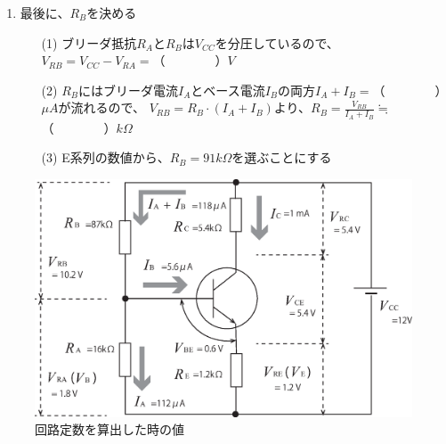 \documentclass[uplatex,a4paper,11pt,oneside,openany]{jsbook}
\begin{document}
\begin{enumerate}
\begin{itembox}[l]{設計条件}
		(6) このトランジスタのベース−エミッタ間の電圧は$V_{BE}\fallingdotseq 0.6V$とする。\\
		(7) $R_A$にはベース電流$I_B$の20倍の電流（ブリーダ電流$I_A$）を流すことにする。
	\end{itembox}
	\begin{enumerate}
		\item[(1)] コレクタ電流$I_C$に$1mA$を流す時のベース電流$I_B$は、
		$I_B=\displaystyle\frac{I_C}{h_{FE}}=$（　　　　）$\mu A$
		\item[(2)] 設計条件（7）よりブリーダ電流は、$I_A=20\times I_B=$（　　　　）$\mu A$
		\item[(3)] ベース電位は$V_B=V_{BE}+V_{RE}$であるから、$V_B=（　　　）＋（　　　）$=（　　　）$V$
		\item[(4)] この値$V_B$は、$R_A$にブリーダ電流$I_A$が流れることによる電圧降下$V_{RA}$に等しいから、\\
		$R_A=\displaystyle\frac{V_{RA}}{I_A}=\frac{V_B}{I_A}=$（　　　）$k\Omega$
	\end{enumerate}
	\vfill
	\item 最後に、$R_B$を決める
	\begin{enumerate}
		\item[(1)] ブリーダ抵抗$R_A$と$R_B$は$V_{CC}$を分圧しているので、
		$V_{RB}=V_{CC}-V_{RA}=$（　　　　）$V$
		\item[(2)] $R_B$にはブリーダ電流$I_A$とベース電流$I_B$の両方$I_A+I_B=$（　　　　）$\mu A$が流れるので、
		$V_{RB}=R_B\cdot(I_A+I_B)$より、$R_B=\displaystyle\frac{V_{RB}}{I_A+I_B}\fallingdotseq$（　　　　）$k\Omega$
		\item[(3)] E系列の数値から、$R_B=91k\Omega$を選ぶことにする
	\end{enumerate}
\end{enumerate}


\begin{figure}[H]
	\centering
	\includegraphics[keepaspectratio, scale=0.45, angle=0]
	{figs/eps/p96fig3a.eps}
	\caption{回路定数を算出した時の値}
	\label{fig:11_2}
\end{figure}
\end{document}
